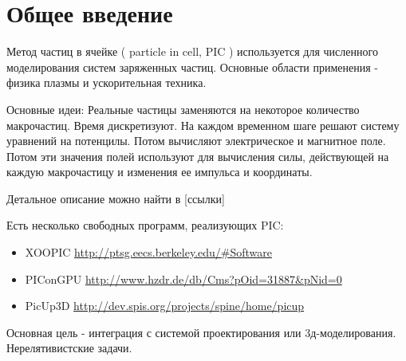 \section{Общее введение}
Метод частиц в ячейке ( particle in cell, PIC ) используется для 
численного моделирования систем заряженных частиц. 
Основные области применения - физика плазмы и ускорительная техника.

Основные идеи:
Реальные частицы заменяются на некоторое количество макрочастиц.
Время дискретизуют.
На каждом временном шаге решают систему уравнений на потенцилы. Потом вычисляют электрическое и магнитное поле.
Потом эти значения полей используют для вычисления силы, действующей на каждую макрочастицу и изменения ее 
импульса и координаты. 

Детальное описание можно найти в [ссылки]

Есть несколько свободных программ, реализующих PIC:

\begin{itemize}
\item XOOPIC \url{http://ptsg.eecs.berkeley.edu/#Software}
\item PIConGPU \url{http://www.hzdr.de/db/Cms?pOid=31887&pNid=0}
\item PicUp3D \url{http://dev.spis.org/projects/spine/home/picup}
\end{itemize}

Основная цель - интеграция с системой проектирования или 3д-моделирования.
Нерелятивистские задачи.



